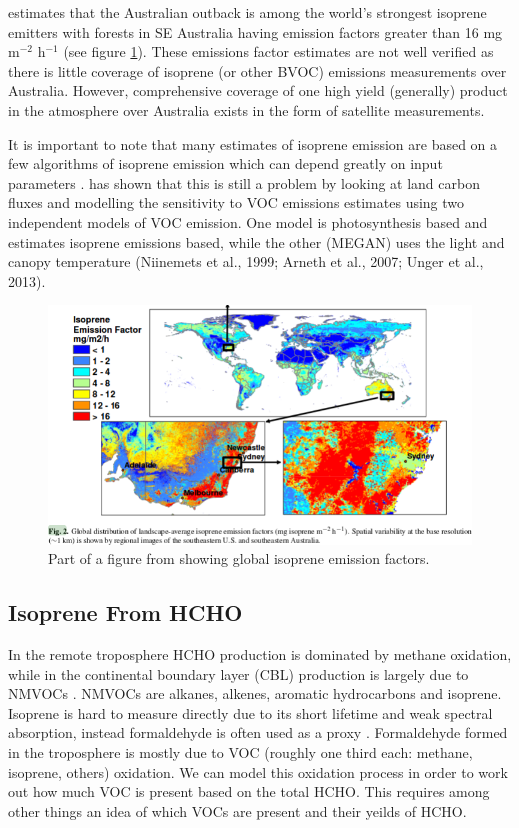     \citet{Guenther2006} estimates that the Australian outback is among the world's strongest isoprene emitters with forests in SE Australia having emission factors greater than 16 mg m$^{-2}$ h$^{-1}$ (see figure \ref{ch1:fig:meganisoprene}).
    These emissions factor estimates are not well verified as there is little coverage of isoprene (or other BVOC) emissions measurements over Australia.
    However, comprehensive coverage of one high yield (generally) product in the atmosphere over Australia exists in the form of satellite measurements.
    
    It is important to note that many estimates of isoprene emission are based on a few algorithms of isoprene emission which can depend greatly on input parameters \citep{Niinemets2010}.
    \citet{Yue2015} has shown that this is still a problem by looking at land carbon fluxes and modelling the sensitivity to VOC emissions estimates using two independent models of VOC emission.
    One model is photosynthesis based and estimates isoprene emissions based, while the other (MEGAN) uses the light and canopy temperature (Niinemets et al., 1999; Arneth et al., 2007; Unger et al., 2013).
    
    \begin{figure}
      \includegraphics{Figures/MeganIsoprene1.png}
      \caption{ Part of a figure from \citet{Guenther2006} showing global isoprene emission factors. }
      \label{ch1:fig:meganisoprene}
    \end{figure}
    
  \subsection{Isoprene From HCHO}
    \label{ch1:sec:IsopFromHCHO}
    In the remote troposphere HCHO production is dominated by methane oxidation, while in the continental boundary layer (CBL) production is largely due to NMVOCs \citep{Abbot2003, Kefauver2014}.
    NMVOCs are alkanes, alkenes, aromatic hydrocarbons and isoprene.
    Isoprene is hard to measure directly due to its short lifetime and weak spectral absorption, instead formaldehyde is often used as a proxy \citep{Millet2006, Marais2012, bauwens2013satellite, Kefauver2014, Bauwens2016}.
    Formaldehyde formed in the troposphere is mostly due to VOC (roughly one third each: methane, isoprene, others) oxidation. 
    We can model this oxidation process in order to work out how much VOC is present based on the total HCHO.
    This requires among other things an idea of which VOCs are present and their yeilds of HCHO.
    
